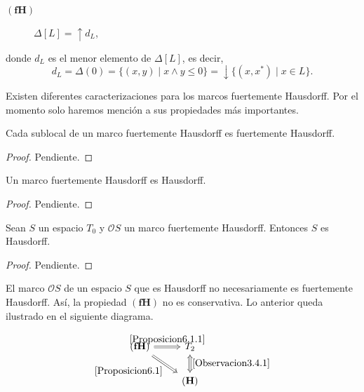 \begin{description}
    \item[$\mathbf{(fH)}$] $\Delta[L]=\uparrow d_L$, 
\end{description}
donde $d_L$ es el menor elemento de $\Delta[L]$, es decir,
\[
d_L=\Delta(0)=\{(x, y)\mid x\wedge y\leq 0\}=\downarrow\{(x, x^*)\mid x\in L\}.
\]

Existen diferentes caracterizaciones para los marcos fuertemente Hausdorff. Por el momento solo haremos mención a sus propiedades más importantes.

\begin{prop}\label{Proposicion5.3.4}
    Cada sublocal de un marco fuertemente Hausdorff es fuertemente Hausdorff.
\end{prop}

\begin{proof}
    Pendiente.
\end{proof}

\begin{prop}\label{Proposicion6.1}
    Un marco fuertemente Hausdorff es Hausdorff.
\end{prop}

\begin{proof}
    Pendiente.
\end{proof}

\begin{prop}\label{Proposicion6.1.1}
    Sean $S$ un espacio $T_0$ y $\mathcal{O}S$ un marco fuertemente Hausdorff. Entonces $S$ es Hausdorff.
\end{prop}

\begin{proof}
    Pendiente.
\end{proof}

El marco $\mathcal{O}S$ de un espacio $S$ que es Hausdorff no necesariamente es fuertemente Hausdorff. Así, la propiedad $\mathbf{(fH)}$ no es conservativa. Lo anterior queda ilustrado en el siguiente diagrama.

\[\begin{tikzcd}
	{\mathbf{(fH)}} & {T_2} \\
	& {\mathbf{(H)}}
	\arrow["{\ref{Proposicion6.1.1}}", Rightarrow, from=1-1, to=1-2]
	\arrow["{\ref{Proposicion6.1}}"', Rightarrow, from=1-1, to=2-2]
	\arrow["{\ref{Observacion3.4.1}}", Leftrightarrow, from=1-2, to=2-2]
\end{tikzcd}\]


